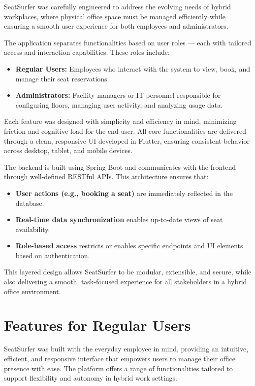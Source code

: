 \documentclass[12pt,a4paper]{report}
\begin{document}
SeatSurfer was carefully engineered to address the evolving needs of hybrid workplaces, where physical office space must be managed efficiently while ensuring a smooth user experience for both employees and administrators.

The application separates functionalities based on user roles — each with tailored access and interaction capabilities. These roles include:

\begin{itemize}
    \item \textbf{Regular Users:} Employees who interact with the system to view, book, and manage their seat reservations.
    \item \textbf{Administrators:} Facility managers or IT personnel responsible for configuring floors, managing user activity, and analyzing usage data.
\end{itemize}

Each feature was designed with simplicity and efficiency in mind, minimizing friction and cognitive load for the end-user. All core functionalities are delivered through a clean, responsive UI developed in Flutter, ensuring consistent behavior across desktop, tablet, and mobile devices.

The backend is built using Spring Boot and communicates with the frontend through well-defined RESTful APIs. This architecture ensures that:

\begin{itemize}
    \item \textbf{User actions (e.g., booking a seat)} are immediately reflected in the database.
    \item \textbf{Real-time data synchronization} enables up-to-date views of seat availability.
    \item \textbf{Role-based access} restricts or enables specific endpoints and UI elements based on authentication.
\end{itemize}

This layered design allows SeatSurfer to be modular, extensible, and secure, while also delivering a smooth, task-focused experience for all stakeholders in a hybrid office environment.

\section{Features for Regular Users}

SeatSurfer was built with the everyday employee in mind, providing an intuitive, efficient, and responsive interface that empowers users to manage their office presence with ease. The platform offers a range of functionalities tailored to support flexibility and autonomy in hybrid work settings.
\end{document}
